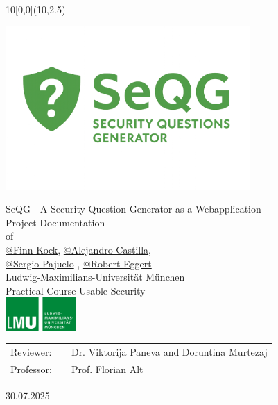 \documentclass{thesisclass}
\makeatletter
\newcommand{\type}{Project Documentation}
\newcommand{\group}{\href{https://github.com/finnkock}{@Finn Kock}, \href{https://github.com/alecasbar}{@Alejandro Castilla}, \\
					\href{https://github.com/sergioPajuelo}{@Sergio Pajuelo} , \href{https://github.com/RobertEggert}{@Robert Eggert}}
\newcommand{\mytitle}{SeQG - A Security Question Generator as a Webapplication}
\newcommand{\course}{Practical Course Usable Security}
\newcommand{\reviewerone}{Dr. Viktorija Paneva and Doruntina Murtezaj}
\newcommand{\prof}{Prof. Florian Alt}
\newcommand{\timeend}{30.07.2025}
\makeatother
\begin{document}
\begin{titlepage}
	\begin{textblock}{10}[0,0](10,2.5)
	\end{textblock}

	\vspace*{0.05cm} %

	\begin{center}
		\includegraphics[width=0.7\textwidth]{images/logoandtext.png}

		\vspace*{1cm} %

		\Huge{\mytitle}
		\vspace*{0.6cm}\\ %
		\Large{
			\type\\of
		}\\
		\vspace*{1cm}
		\huge{\group}\\
		\vspace*{1cm} %
		\Large{
			{Ludwig-Maximilians-Universität München}
			\\
			\course
            \\
            \vspace*{0.7cm}
            \includegraphics[width=0.2\textwidth]{images/Logo_LMU.png}
		}
	\end{center}

	\vspace*{0.3cm} %

	\Large{
		\begin{center}
			\begin{tabular}[ht]{l c l}
				Reviewer: & \hfill  & \reviewerone\\
                Professor: & \hfill & \prof
			\end{tabular}
		\end{center}
	}
	
	\vspace{1cm} %
	\begin{center}
		\timeend
	\end{center}
\end{titlepage}

\renewcommand{\contentsname}{Index}
\tableofcontents
\clearpage




\end{document}
